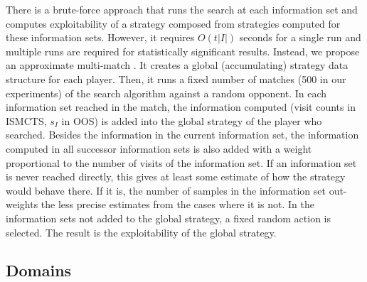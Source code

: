 \documentclass{aamas2015}
\newcounter{vlNoteCounter}
\newcommand{\vlnote}[1]{{\scriptsize \color{blue} $\blacksquare$ \refstepcounter{vlNoteCounter}\textsf{[VL]$_{\arabic{vlNoteCounter}}$:{#1}}}}
\renewcommand{\vlnote}[1]{}
\newcommand{\defword}[1]{\textbf{\boldmath{#1}}}
\begin{document}
There is a brute-force approach that runs the search at each information set and computes exploitability of a strategy composed from strategies computed for these information sets. However, it requires $O(t |I|)$ seconds for a single run and multiple runs are required for statistically significant results.
Instead, we propose an approximate multi-match \defword{aggregate method}. 
It creates a global (accumulating) strategy data structure for each player.
Then, it runs a fixed number of matches (500 in our experiments) of the search algorithm against a random opponent. In each information set reached in the match, the information computed (visit counts in ISMCTS, $s_I$ in OOS) is added into the global strategy of the player who searched.
Besides the information in the current information set, the information computed in all successor information sets is also added with a weight proportional to the number of visits of the information set.
If an information set is never reached directly, this gives at least some estimate of how the strategy would behave there. If it is, the number of samples in the information set out-weights the less precise estimates from the cases where it is not. In the information sets not added to the global strategy, a fixed random action is selected. The result is the exploitability of the global strategy.


\subsection{Domains}
\vlnote{comment on domain sizes}
\end{document}
